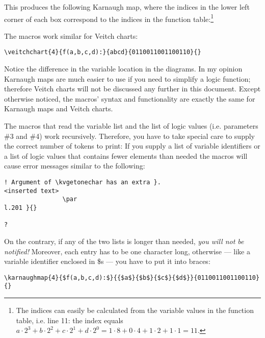 \documentclass{article}
\begin{document}
This produces the following Karnaugh map, where the indices in the lower left
corner of each box correspond to the indices in the function
table:\footnote{The indices can easily be calculated from the variable values
  in the function table, i.e. line 11: the index equals $a\cdot 2^3 + b\cdot
  2^2 + c \cdot 2^1 + d \cdot 2^0=1\cdot 8 + 0\cdot 4 + 1 \cdot 2 + 1 \cdot
  1=11$.} 

\begin{center}
\end{center}

The macros work similar for Veitch charts:

\begin{verbatim}
\veitchchart{4}{f(a,b,c,d):}{abcd}{0110011001100110}{}
\end{verbatim}

\begin{center}
\end{center}

Notice the difference in the variable location in the diagrams. In my opinion
Karnaugh maps are much easier to use if you need to simplify a logic function;
therefore Veitch charts will not be discussed any further in this
document. Except otherwise noticed, the macros' syntax and functionality are
exactly the same for Karnaugh maps and Veitch charts.

The macros that read the variable list and the list of logic values
(i.e. parameters \#3 and \#4) work
recursively. Therefore, you have to take special care to supply the
correct number of tokens to print: If you supply a list of variable
identifiers or a list of logic values that contains fewer elements than needed
the macros will cause error messages similar to the following:

\begin{verbatim}
! Argument of \kvgetonechar has an extra }.
<inserted text>
                \par
l.201 }{}

?  
\end{verbatim}

On the contrary, if any of the two lists is longer than
needed, \emph{you will not be notified!}  Moreover, each entry has to be one
character long, otherwise --- like a variable identifier enclosed in \$s ---
you have to put it into braces:

\begin{verbatim}
\karnaughmap{4}{$f(a,b,c,d):$}{{$a$}{$b$}{$c$}{$d$}}{0110011001100110}{}
\end{verbatim}
\end{document}
